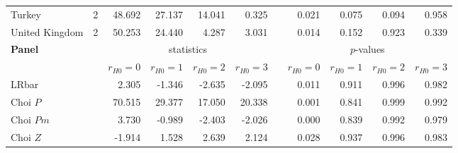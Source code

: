 \begin{tabular}{lrrrrrrrrrr}
	Turkey & 2 & 48.692 & 27.137 & 14.041 &  0.325 &   & 0.021 & 0.075 & 0.094 & 0.958 \\
	United Kingdom & 2 & 50.253 & 24.440 &  4.287 &  3.031 &   & 0.014 & 0.152 & 0.923 & 0.339 \\
	 \hline
	\multicolumn{2}{l}{ \textbf{Panel} } & \multicolumn{4}{c}{ statistics } &  & \multicolumn{4}{c}{ $ p $-values } \\
	\cline{3-6} \cline{8-11}
	  &   & $ r_{H0} = 0 $ & $ r_{H0} = 1 $ & $ r_{H0} = 2 $ & $ r_{H0} = 3 $ &   & $ r_{H0} = 0 $ & $ r_{H0} = 1 $ & $ r_{H0} = 2 $ & $ r_{H0} = 3 $ \\
	\hline
	\multicolumn{2}{l}{LRbar} &  2.305 & -1.346 & -2.635 & -2.095 &   & 0.011 & 0.911 & 0.996 & 0.982 \\
	\multicolumn{2}{l}{Choi $P$} & 70.515 & 29.377 & 17.050 & 20.338 &   & 0.001 & 0.841 & 0.999 & 0.992 \\
	\multicolumn{2}{l}{Choi $Pm$} &  3.730 & -0.989 & -2.403 & -2.026 &   & 0.000 & 0.839 & 0.992 & 0.979 \\
	\multicolumn{2}{l}{Choi $Z$} & -1.914 &  1.528 &  2.639 &  2.124 &   & 0.028 & 0.937 & 0.996 & 0.983 \\
	\hline \hline
\end{tabular}
